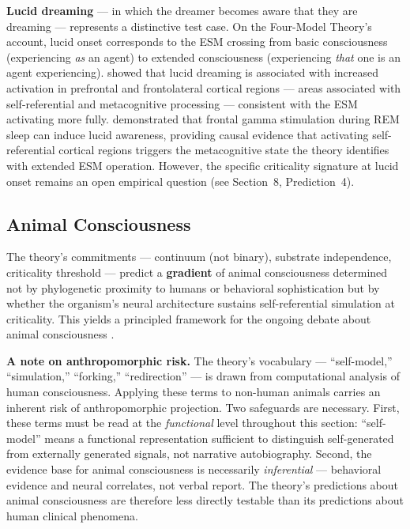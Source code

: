 \documentclass[12pt]{article}
\newcommand{\revstart}{}
\newcommand{\revend}{}
\begin{document}
{\textbf{Lucid dreaming} --- in which the dreamer becomes aware that they are dreaming --- represents a distinctive test case. On the Four-Model Theory's account, lucid onset corresponds to the ESM crossing from basic consciousness (experiencing \emph{as} an agent) to extended consciousness (experiencing \emph{that} one is an agent experiencing). \citet{Dresler2012} showed that lucid dreaming is associated with increased activation in prefrontal and frontolateral cortical regions --- areas associated with self-referential and metacognitive processing --- consistent with the ESM activating more fully. \citet{Voss2014} demonstrated that frontal gamma stimulation during REM sleep can induce lucid awareness, providing causal evidence that activating self-referential cortical regions triggers the metacognitive state the theory identifies with extended ESM operation. However, the specific criticality signature at lucid onset remains an open empirical question (see Section~8, Prediction~4).\revend}


\subsection{Animal Consciousness}


The theory's commitments --- continuum (not binary), substrate independence, criticality threshold --- predict a \textbf{gradient} of animal consciousness determined not by phylogenetic proximity to humans or behavioral sophistication but by whether the organism's neural architecture sustains self-referential simulation at criticality. This yields a principled framework for the ongoing debate about animal consciousness \citep{BirchSchnellClayton2020,BarronKlein2016}.

{\revstart\textbf{A note on anthropomorphic risk.} The theory's vocabulary --- ``self-model,'' ``simulation,'' ``forking,'' ``redirection'' --- is drawn from computational analysis of human consciousness. Applying these terms to non-human animals carries an inherent risk of anthropomorphic projection. Two safeguards are necessary. First, these terms must be read at the \emph{functional} level throughout this section: ``self-model'' means a functional representation sufficient to distinguish self-generated from externally generated signals, not narrative autobiography. Second, the evidence base for animal consciousness is necessarily \emph{inferential} --- behavioral evidence and neural correlates, not verbal report. The theory's predictions about animal consciousness are therefore less directly testable than its predictions about human clinical phenomena.\revend}
\end{document}
